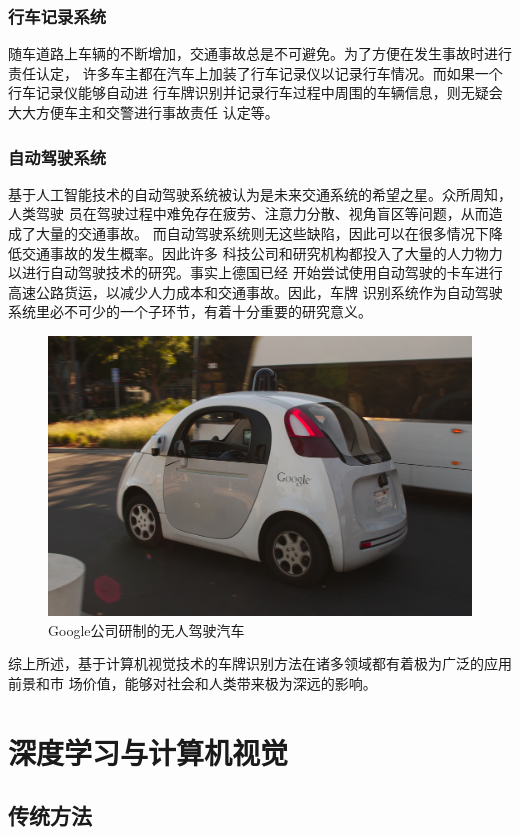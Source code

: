 \subsubsection{行车记录系统}

随车道路上车辆的不断增加，交通事故总是不可避免。为了方便在发生事故时进行责任认定，
许多车主都在汽车上加装了行车记录仪以记录行车情况。而如果一个行车记录仪能够自动进
行车牌识别并记录行车过程中周围的车辆信息，则无疑会大大方便车主和交警进行事故责任
认定等。

\subsubsection{自动驾驶系统}

基于人工智能技术的自动驾驶系统被认为是未来交通系统的希望之星。众所周知，人类驾驶
员在驾驶过程中难免存在疲劳、注意力分散、视角盲区等问题，从而造成了大量的交通事故。
而自动驾驶系统则无这些缺陷，因此可以在很多情况下降低交通事故的发生概率。因此许多
科技公司和研究机构都投入了大量的人力物力以进行自动驾驶技术的研究。事实上德国已经
开始尝试使用自动驾驶的卡车进行高速公路货运，以减少人力成本和交通事故。因此，车牌
识别系统作为自动驾驶系统里必不可少的一个子环节，有着十分重要的研究意义。

\begin{figure}[ht]
  \centering
  \includegraphics[width=0.8\linewidth]{./Figure/GoogleSelfDrivingCar.jpg}
  \caption{Google公司研制的无人驾驶汽车}
\end{figure}

综上所述，基于计算机视觉技术的车牌识别方法在诸多领域都有着极为广泛的应用前景和市
场价值，能够对社会和人类带来极为深远的影响。

\section{深度学习与计算机视觉}
\subsection{传统方法}

